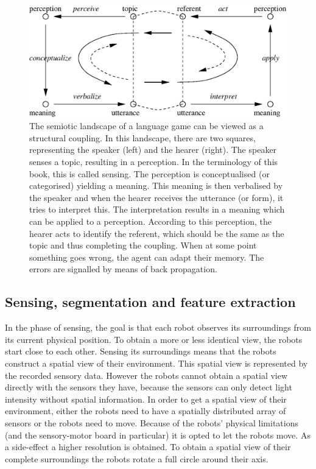 
\begin{figure}[t]
\centerline{\includegraphics[width=\textwidth]{discr_games/semiotic1.eps}}
\caption{The semiotic landscape of a language game can be viewed as a structural coupling. In this landscape, there are two squares, representing the speaker (left) and the hearer (right). The speaker senses a topic, resulting in a perception. In the terminology of this book, this is called sensing. The perception is conceptualised (or categorised) yielding a meaning. This meaning is then verbalised by the speaker and when the hearer receives the utterance (or form), it tries to interpret this. The interpretation results in a meaning which can be applied to a perception. According to this perception, the hearer acts to identify the referent, which should be the same as the topic and thus completing the coupling. When at some point something goes wrong, the agent can adapt their memory. The errors are signalled by means of back propagation.}
\label{f:cm:semiotic}
\end{figure}

\subsection{Sensing, segmentation and feature extraction}\label{s:lg:perception}

In the phase of sensing, the goal is that each robot observes its surroundings from its current physical position. To obtain a more or less identical view, the robots start close to each other. Sensing its surroundings means that the robots construct a spatial view of their environment. This spatial view is represented by the recorded sensory data. However the robots cannot obtain a spatial view directly with the sensors they have, because the sensors can only detect light intensity without spatial information. In order to get a spatial view of their environment, either the robots need to have a spatially distributed array of sensors or the robots need to move. Because of the robots' physical limitations (and the sensory-motor board in particular) it is opted to let the robots move. As a side-effect a higher resolution is obtained. To obtain a spatial view of their complete surroundings the robots rotate a full circle around their axis.

